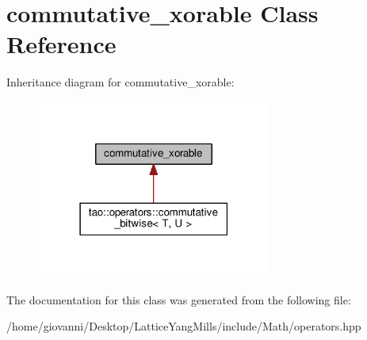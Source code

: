 \hypertarget{classcommutative__xorable}{}\section{commutative\+\_\+xorable Class Reference}
\label{classcommutative__xorable}


Inheritance diagram for commutative\+\_\+xorable\+:\nopagebreak
\begin{figure}[H]
\begin{center}
\leavevmode
\includegraphics[width=219pt]{classcommutative__xorable__inherit__graph}
\end{center}
\end{figure}


The documentation for this class was generated from the following file\+:\begin{DoxyCompactItemize}
\item 
/home/giovanni/\+Desktop/\+Lattice\+Yang\+Mills/include/\+Math/operators.\+hpp\end{DoxyCompactItemize}
